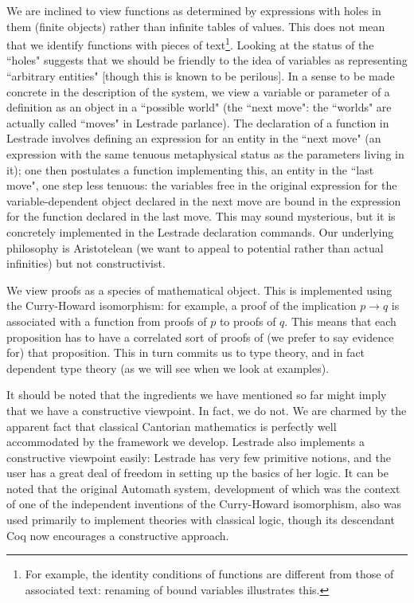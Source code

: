 \documentclass[12pt]{article}
\begin{document}
We are inclined to view functions as determined by expressions with holes in them (finite objects) rather than infinite tables of values.  This does not mean that we identify
functions with pieces of text\footnote{For example, the identity conditions of functions are different from those of associated text:  renaming of bound variables illustrates this.}.  Looking at the status of the ``holes"  suggests that we should be friendly to the idea of variables as representing ``arbitrary entities" [though this is known to be perilous].  In a sense to be made concrete in the description of the system, we view a variable or parameter of a definition as an object in a ``possible world" (the ``next move":  the ``worlds" are actually called ``moves" in Lestrade parlance).  The declaration of a function in Lestrade involves defining an expression for an entity in the ``next move" (an expression with the same tenuous metaphysical status
as the parameters living in it); one then postulates a function implementing this, an entity in the ``last move", one step less tenuous:  the variables free in the original expression for the variable-dependent object declared  in the next move are bound in the expression for the function declared in the last move.  This may sound mysterious, but it is concretely implemented in the Lestrade declaration commands.  Our underlying philosophy is Aristotelean (we want to appeal to potential rather than actual infinities) but not constructivist.

We view proofs as a species of mathematical object.  This is implemented using the Curry-Howard isomorphism:  for example, a proof of the implication $p \rightarrow q$ is associated with a function from proofs of $p$ to proofs of $q$.  This means that each proposition has to have a correlated sort of proofs of (we prefer to say evidence for) that proposition.  This in turn commits us to type theory, and in fact dependent type theory (as we will see when we look at examples).

It should be noted that the ingredients we have mentioned so far might imply that we have a constructive viewpoint.  In fact, we do not.  We are charmed by the apparent fact that classical
Cantorian mathematics is perfectly well accommodated by the framework we develop.  Lestrade also implements a constructive viewpoint easily:  Lestrade has very few primitive notions, and the user has a great deal of freedom in setting up the basics of her logic.  It can be noted that the original Automath system, development of which was the context of one of the independent inventions of the Curry-Howard isomorphism, also was used primarily to implement theories with classical logic, though its descendant Coq now encourages a constructive approach.
\end{document}
